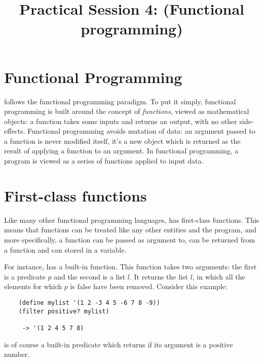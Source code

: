 \documentclass{../../../tp}
\title{Practical Session 4: \scheme (Functional programming)}
\author{}
\begin{document}
	
	\maketitle



\section{Functional Programming}

\scheme follows the functional programming paradigm. To put it simply, functional programming is built around the concept of \emph{functions}, viewed as mathematical objects: a function takes some inputs and returns an output, with no other side-effects. Functional programming avoids mutation of data: an argument passed to a function is never modified itself, it's a new object which is returned as the result of applying a function to an argument. In functional programming, a program is viewed as a series of functions applied to input data.

\section{First-class functions}

Like many other functional programming languages, \scheme has first-class functions. This means that functions can be treated like any other entities and the program, and more specifically, a function can be passed as argument to, can be returned from a function and can stored in a variable.

For instance, \scheme has a built-in  function. This function takes two arguments: the first is a predicate $p$ and the second is a list $l$. It returns the list $l$, in which all the elements for which $p$ is false have been removed. Consider this example:

\begin{verbatim}
	(define mylist '(1 2 -3 4 5 -6 7 8 -9))
	(filter positive? mylist)
	 
	 -> '(1 2 4 5 7 8)
\end{verbatim}

 is of course a built-in \scheme predicate which returns  if its argument is a positive number. 
\end{document}
